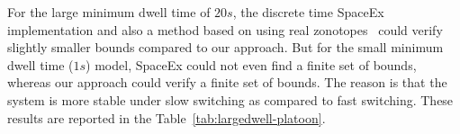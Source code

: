   For the large minimum dwell time of $20s$, the
discrete time SpaceEx implementation and also a method based on using
real zonotopes~\cite{makhlouf2014networked} could verify slightly
smaller bounds compared to our approach.  But for the small minimum
dwell time ($1s$) model, SpaceEx could not even find a finite set of
bounds, whereas our approach could verify a finite set of bounds.  The
reason is that the system is more stable under slow switching as
compared to fast switching.  These results are reported in the
Table~\ref{tab:largedwell-platoon}.








